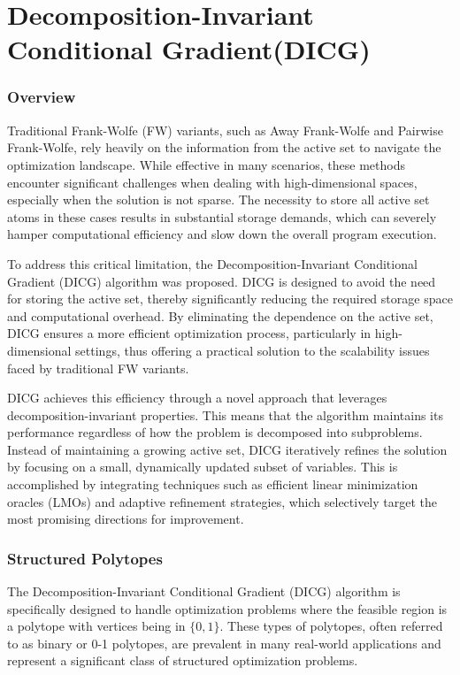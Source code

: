 \newpage


\section{Decomposition-Invariant Conditional Gradient(DICG)\label{sec:DICG}}

\subsubsection{Overview}
Traditional Frank-Wolfe (FW) variants, such as Away Frank-Wolfe and Pairwise Frank-Wolfe, rely heavily on the information from the active set to navigate the optimization landscape. While effective in many scenarios, these methods encounter significant challenges when dealing with high-dimensional spaces, especially when the solution is not sparse. The necessity to store all active set atoms in these cases results in substantial storage demands, which can severely hamper computational efficiency and slow down the overall program execution.

To address this critical limitation, the Decomposition-Invariant Conditional Gradient (DICG) algorithm was proposed. DICG is designed to avoid the need for storing the active set, thereby significantly reducing the required storage space and computational overhead. By eliminating the dependence on the active set, DICG ensures a more efficient optimization process, particularly in high-dimensional settings, thus offering a practical solution to the scalability issues faced by traditional FW variants.

DICG achieves this efficiency through a novel approach that leverages decomposition-invariant properties. This means that the algorithm maintains its performance regardless of how the problem is decomposed into subproblems. Instead of maintaining a growing active set, DICG iteratively refines the solution by focusing on a small, dynamically updated subset of variables. This is accomplished by integrating techniques such as efficient linear minimization oracles (LMOs) and adaptive refinement strategies, which selectively target the most promising directions for improvement.

\subsubsection{Structured Polytopes}
The Decomposition-Invariant Conditional Gradient (DICG) algorithm is specifically designed to handle optimization problems where the feasible region is a polytope with vertices being in \(\{0, 1\}\). These types of polytopes, often referred to as binary or 0-1 polytopes, are prevalent in many real-world applications and represent a significant class of structured optimization problems.

